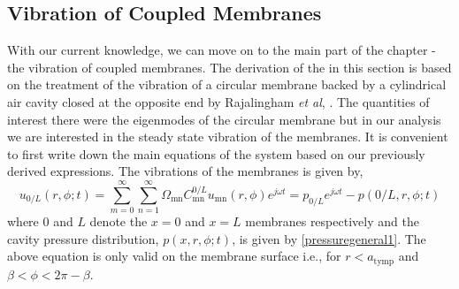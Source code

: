 \subsection{Vibration of Coupled Membranes}\label{coupledmembranes}
With our current knowledge, we can move on to the main part of the chapter - the vibration of coupled membranes. 
The derivation of the in this section is based on the treatment of the vibration of a circular membrane backed by
a cylindrical air cavity closed at the opposite end by Rajalingham \emph{et al}, \cite{rajalinghambhat}. The quantities of
interest there were the eigenmodes of the circular membrane but in our analysis we are interested in the steady state vibration
of the membranes.
It is convenient to first write down the main equations of the system based on our previously derived expressions.
The vibrations of the membranes is given by,
\begin{equation}\label{coupledmembraneseries}
 u_{0/L}(r,\phi;t)=\displaystyle\sum^{\infty}_{m=0}\sum^{\infty}_{n=1}\Omega_{\mathrm{mn}}C^{0/L}_{\mathrm{mn}}u_{\mathrm{mn}}(r,\phi)e^{j\omega t}=p_{0/L}e^{j\omega t}-p(0/L,r,\phi;t)
\end{equation}
where $0$ and $L$ denote the $x=0$ and $x=L$ membranes respectively and the cavity pressure distribution, $p(x,r,\phi;t)$,  is given by \eqref{pressuregeneral1}.
The above equation is only valid on the membrane surface i.e., for $r<a_{\mathrm{tymp}}$ and $\beta<\phi<2\pi-\beta$.

